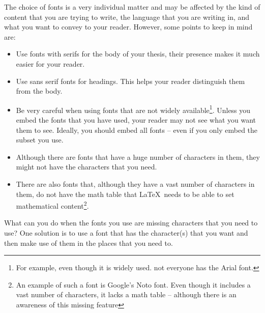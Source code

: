 \documentclass[main.tex]{subfiles}
\begin{document}
The choice of fonts is a very individual matter and may be affected by the kind of content that you are trying to write, the language that you are writing in, and what you want to convey to your reader. However, some points to keep in mind are:
\begin{itemize}
    \item Use fonts with serifs for the body of your thesis, their presence makes it much easier for your reader.

    \item Use sans serif fonts for headings. This helps your reader distinguish them from the body.

    \item Be very careful when using fonts that are not widely available\footnote{For example, even though it is widely used. not everyone has the Arial font.}. Unless you embed the fonts that you have used, your reader may not see what you want them to see. Ideally, you should embed all fonts -- even if you only embed the subset you use.

    \item Although there are fonts that have a huge number of characters in them, they might not have the characters that you need.

    \item There are also fonts that, although they have a vast number of characters in them, do not have the math table that \LaTeX\ needs to be able to set mathematical content\footnote{An example of such a font is Google's Noto font. Even though it includes a vast number of characters, it lacks a math table -- although there is an awareness of this missing feature}.
\end{itemize}

What can you do when the fonts you use are missing characters that you need to use? One solution is to use a font that has the character(s) that you want and then make use of them in the places that you need to.

\end{document}
